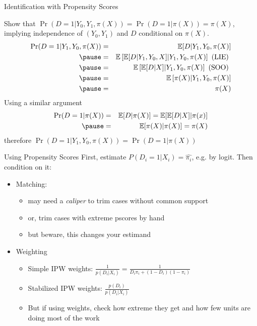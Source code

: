 \documentclass[xcolor=dvipsnames]{beamer}
\newcommand\E{\mathbb{E}}
\begin{document}
\begin{frame}{Identification with Propensity Scores}
\begin{Proof}
\small
Show that $\Pr(D = 1|Y_0, Y_1, \pi(X)) = \Pr(D = 1|\pi(X)) = \pi(X)$, implying
independence of $(Y_0,Y_1)$ and $D$ conditional on $\pi(X)$.
\begin{eqnarray*}
\Pr(D=1|Y_1,Y_0,\pi(X))&=&\E[D|Y_1,Y_0,\pi(X)]\\ \pause
&=&\E\left[\E[D|Y_1,Y_0,X]|Y_1,Y_0,\pi(X)\right] \mbox{ (LIE) }\\ \pause
&=&\E\left[\E[D|X]|Y_1,Y_0,\pi(X)\right] \mbox{ (SOO) } \\\pause
&=&\E\left[\pi(X)|Y_1,Y_0,\pi(X)\right] \\ \pause
&=&\pi(X)
\end{eqnarray*}
Using a similar argument
\begin{eqnarray*}
\Pr(D=1|\pi(X))&=&\E[D|\pi(X)]=\E[\E[D|X]|\pi(x)]\\ \pause
&=&\E[\pi(X)|\pi(X)]=\pi(X)
\end{eqnarray*}
therefore $\Pr(D=1|Y_1,Y_0,\pi(X))=\Pr(D=1|\pi(X))$
\end{Proof}
\end{frame}

\begin{frame}{Using Propensity Scores}
  First, estimate $P(D_i=1|X_i) = \hat{\pi_i}$, e.g. by logit.  Then condition on it:
\small
\begin{itemize}
\item<2-> Matching:
\footnotesize 
\begin{itemize}
\item may need a \textit{caliper} to trim cases without common support
\item or, trim cases with extreme pscores by hand
\item but beware, this changes your estimand
\end{itemize}  
\small
\item<3-> Weighting
\footnotesize
\begin{itemize}
\item<4-> Simple IPW weights:  $\frac{1}{p(D_i|X_i)}=\frac{1}{D_i \pi_i + (1-D_i)(1-\pi_i)}$
\item<5-> Stabilized IPW weights: $\frac{p(D_i)}{p(D_i|X_i)}$ 
\item<6-> But if using weights, check how extreme they get and how few units are doing most of the work
\end{itemize}
\end{itemize}
\end{frame}
\end{document}
